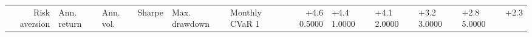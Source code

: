 \begin{tabular}{rllrllrl}
\toprule
Risk aversion & Ann. return & Ann. vol. & Sharpe & Max. drawdown & Monthly CVaR 1%
 & +4.6%
0.5000 & +4.4%
1.0000 & +4.1%
2.0000 & +3.2%
3.0000 & +2.8%
5.0000 & +2.3%
\bottomrule
\end{tabular}

